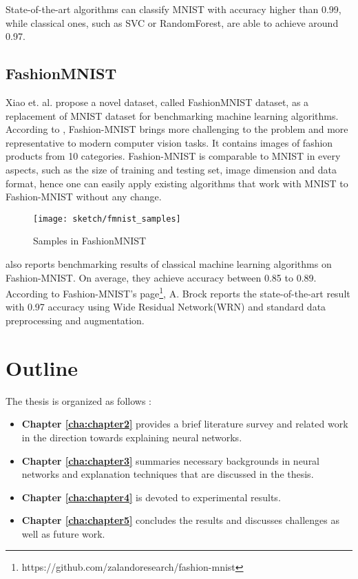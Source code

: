 State-of-the-art algorithms can classify MNIST with accuracy higher than 0.99, while classical ones, such as SVC or RandomForest, are able to achieve around 0.97\cite{XiaoFashionMNISTNovelImage2017}.


\subsection{FashionMNIST}

Xiao et. al.\cite{XiaoFashionMNISTNovelImage2017} propose a novel dataset, called FashionMNIST dataset, as a replacement of MNIST dataset for benchmarking machine learning algorithms.  According to \cite{XiaoFashionMNISTNovelImage2017},  Fashion-MNIST brings more challenging to the problem and more representative to modern computer vision tasks. It contains images of fashion products from 10 categories. Fashion-MNIST is comparable to MNIST in every aspects, such as the size of training and testing set, image dimension and data format, hence one can easily  apply existing algorithms that work with MNIST to Fashion-MNIST without any change.

\begin{figure}[!hbt]
\centering
\texttt{[image: sketch/fmnist\_samples]}
\caption{Samples in FashionMNIST}
\label{fig:fashion_mnist_samples}
\end{figure}

\cite{XiaoFashionMNISTNovelImage2017} also reports benchmarking results of classical machine learning algorithms on Fashion-MNIST. On average, they achieve accuracy between 0.85 to 0.89. According to Fashion-MNIST's page\footnote{https://github.com/zalandoresearch/fashion-mnist}, A. Brock reports the state-of-the-art result  with 0.97 accuracy using Wide Residual Network(WRN)\cite{ZagoruykoWideResidualNetworks2016} and standard data preprocessing and augmentation.


\section{Outline}
The thesis is organized as follows :
\begin{itemize}
	\item \textbf{Chapter \ref{cha:chapter2}} provides a brief literature survey and related work in the direction towards explaining neural networks.
	\item \textbf{Chapter \ref{cha:chapter3}} summaries necessary backgrounds in neural networks and explanation techniques that are discussed in the thesis.
	\item \textbf{Chapter \ref{cha:chapter4}} is devoted to experimental results.
	\item \textbf{Chapter \ref{cha:chapter5}} concludes the results and discusses challenges as well as future work.
\end{itemize}

